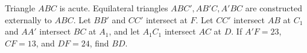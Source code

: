 Triangle $ABC$ is acute. Equilateral triangles $ABC',AB'C,A'BC$ are constructed externally to $ABC$. Let $BB'$ and $CC'$ intersect at $F$. Let $CC'$ intersect $AB$ at $C_1$ and $AA'$ intersect $BC$ at $A_1$, and let $A_1C_1$ intersect $AC$ at $D$. If $A'F=23$, $CF=13$, and $DF=24$, find $BD$.